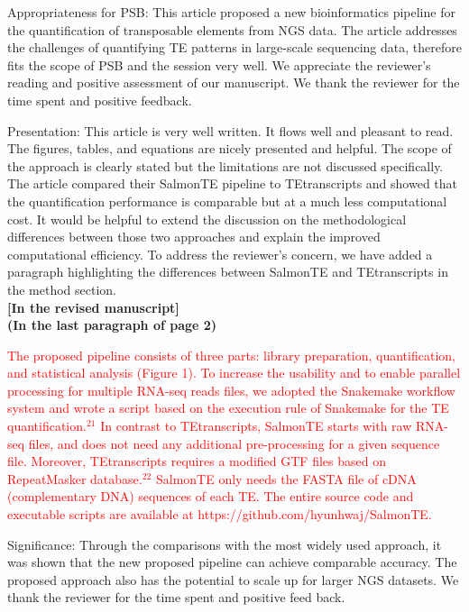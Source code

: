 \documentclass[10pt]{article}
\begin{document}
\begin{response}{Appropriateness for PSB: This article proposed a new bioinformatics pipeline for the quantification of transposable elements from NGS data. The article addresses the challenges of quantifying TE patterns in large-scale sequencing data, therefore fits the scope of PSB and the session very well.}
We appreciate the reviewer's reading and positive assessment of our manuscript.
We thank the reviewer for the time spent and positive feedback.
\end{response}
\begin{response}{Presentation: This article is very well written. It flows well and pleasant to read. The figures, tables, and equations are nicely presented and helpful. The scope of the approach is clearly stated but the limitations are not discussed specifically. The article compared their SalmonTE pipeline to TEtranscripts and showed that the quantification performance is comparable but at a much less computational cost. 
It would be helpful to extend the discussion on the methodological differences between those two approaches and explain the improved computational efficiency.}
To address the reviewer's concern, we have added a paragraph highlighting the differences between SalmonTE and TEtranscripts in the method section.
\\

\textbf{[In the revised manuscript]}  \\
\textbf{(In the last paragraph of page 2)} 

\textcolor{red}{
The proposed pipeline consists of three parts: library preparation, quantification, and statistical analysis (Figure 1). 
    To increase the usability and to enable parallel processing for multiple RNA-seq reads files, we adopted the Snakemake workflow system and wrote a script based on the execution rule of Snakemake for the TE quantification.$^{21}$ 
    In contrast to TEtranscripts, 
    SalmonTE starts with raw RNA-seq files, and does not need any additional pre-processing for a given sequence file. 
    Moreover, TEtranscripts requires a modified GTF files based on RepeatMasker database.$^{22}$ SalmonTE only needs the FASTA file of cDNA (complementary DNA) sequences of each TE. The entire source code and executable scripts are available at https://github.com/hyunhwaj/SalmonTE.
}

\end{response}
\begin{response}{Significance: Through the comparisons with the most widely used approach, it was shown that the new proposed pipeline can achieve comparable accuracy. The proposed approach also has the potential to scale up for larger NGS datasets.}
We thank the reviewer for the time spent  and positive feed back.
\end{response}
\end{document}

